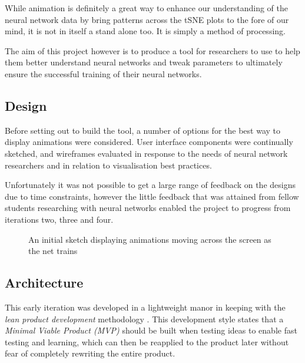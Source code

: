 \documentclass[a4paper,11pt,titlepage]{article}
\begin{document}
	While animation is definitely a great way to enhance our understanding of the neural network data by bring patterns across the tSNE plots to the fore of our mind, it is not in itself a stand alone too. It is simply a method of processing. 
	\par 
	The aim of this project however is to produce a tool for researchers to use to help them better understand neural networks and tweak parameters to ultimately ensure the successful training of their neural networks.
	\par 
	
	\subsection{Design}
	Before setting out to build the tool, a number of options for the best way to display animations were considered. User interface components were continually sketched, and wireframes evaluated in response to the needs of neural network researchers and in relation to visualisation best practices. 
	\par 
	Unfortunately it was not possible to get a large range of feedback on the designs due to time constraints, however the little feedback that was attained from fellow students researching with neural networks enabled the project to progress from iterations two, three and four. 
	
	\begin{figure}[H]
    			\caption{An initial sketch displaying animations moving across the screen as the net trains}%
	\end{figure}		
	
	
	
	\subsection{Architecture}
	This early iteration was developed in a lightweight manor in keeping with the \textit{lean product development} methodology \cite{}. This development style states that a \textit{Minimal Viable Product (MVP)} should be built when testing ideas to enable fast testing and learning, which can then be reapplied to the product later without fear of completely rewriting the entire product.
	\par 
		
\end{document}
